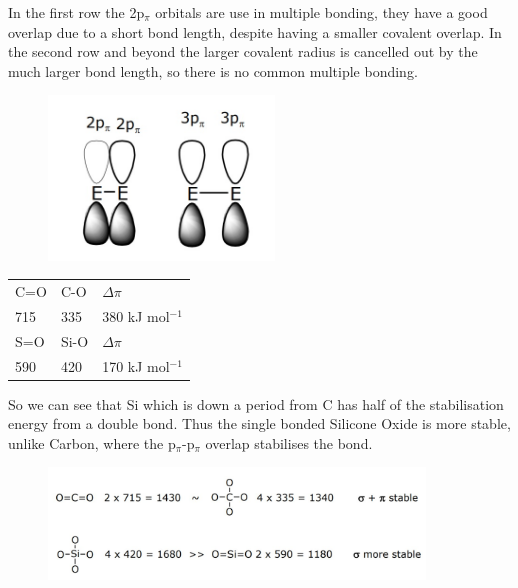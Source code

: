 \documentclass{article}
\begin{document}
    In the first row the 2p\(_\pi\) orbitals are use in multiple bonding, they have a good overlap due to a short
    bond length, despite having a smaller covalent overlap.
    In the second row and beyond the larger covalent radius is cancelled out by the much larger bond length, so
    there is no common multiple bonding.

    \begin{figure}[h]
        \centering
        \includegraphics[width=6cm]{ov.jpg}
    \end{figure}

    \begin{center}
        \begin{tabular*}{4cm}{l l l}
            C=O & C-O & \(\Delta\pi\)\\
            715 & 335 & 380 kJ mol\(^{-1}\)\\
            S=O & Si-O & \(\Delta\pi\)\\
            590 & 420 & 170 kJ mol\(^{-1}\)
        \end{tabular*}
    \end{center}

    So we can see that Si which is down a period from C has half of the stabilisation energy from a double bond.
    Thus the single bonded Silicone Oxide is more stable, unlike Carbon, where the p\(_\pi\)-p\(_\pi\) overlap
    stabilises the bond.

    \begin{figure}[h]
        \centering
        \includegraphics[width=10cm]{stab.jpg}
    \end{figure}
    \newpage
\end{document}
